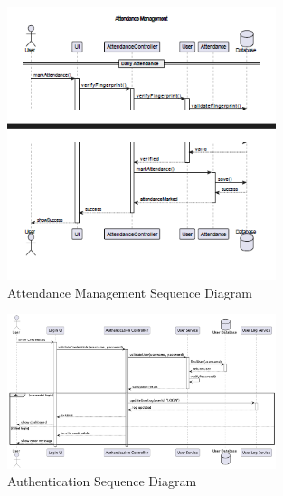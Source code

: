 \documentclass[12pt,a4paper]{report}
\begin{document}
\begin{figure}[htbp]
    \centering
    \includegraphics[width=0.7\textwidth]{attendance-management-sequence.png}
    \caption{Attendance Management Sequence Diagram}
    \label{fig:attendance-management-sequence}
\end{figure}

\begin{figure}[htbp]
    \centering
    \includegraphics[width=0.7\textwidth]{authentication-sequence.png}
    \caption{Authentication Sequence Diagram}
    \label{fig:authentication-sequence}
\end{figure}
\end{document}
